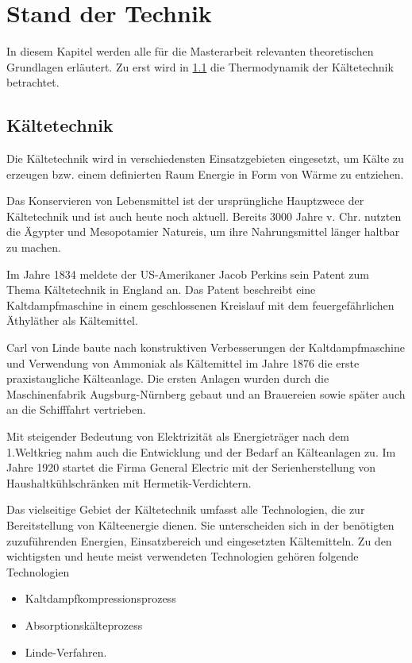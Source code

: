 \chapter{Stand der Technik}
\label{cha:Stand der Technik}

In diesem Kapitel werden alle für die Masterarbeit relevanten theoretischen Grundlagen erläutert. 
Zu erst wird in \ref{sec:Kaeltetechnik} die Thermodynamik der Kältetechnik betrachtet. 

\section{Kältetechnik}
\label{sec:Kaeltetechnik}

Die Kältetechnik wird in verschiedensten Einsatzgebieten eingesetzt, um Kälte zu erzeugen bzw. einem definierten Raum Energie in Form von Wärme zu entziehen. 

Das Konservieren von Lebensmittel ist  der ursprüngliche Hauptzwece der Kältetechnik und ist auch heute noch aktuell. Bereits 3000 Jahre v. Chr. nutzten die Ägypter und Mesopotamier Natureis, um ihre Nahrungsmittel länger haltbar zu machen.\citep{Danfoss2006}

Im Jahre 1834 meldete der US-Amerikaner Jacob Perkins sein Patent zum Thema Kältetechnik in England an. Das Patent beschreibt eine Kaltdampfmaschine in einem geschlossenen Kreislauf mit dem feuergefährlichen Äthyläther als Kältemittel.\citep{Siemens2007}

Carl von Linde baute nach konstruktiven Verbesserungen der Kaltdampfmaschine und Verwendung von Ammoniak als Kältemittel im Jahre 1876 die erste praxistaugliche Kälteanlage. Die ersten Anlagen wurden durch die Maschinenfabrik Augsburg-Nürnberg gebaut und an Brauereien sowie später auch an die Schifffahrt vertrieben.

Mit steigender Bedeutung von Elektrizität als Energieträger nach dem 1.Weltkrieg nahm auch die Entwicklung und der Bedarf an Kälteanlagen zu. Im Jahre 1920 startet die Firma General Electric mit der Serienherstellung von Haushaltkühlschränken mit Hermetik-Verdichtern.

Das vielseitige Gebiet der Kältetechnik umfasst alle Technologien, die zur Bereitstellung von Kälteenergie dienen. Sie unterscheiden sich in der benötigten zuzuführenden Energien, Einsatzbereich und eingesetzten Kältemitteln.  Zu den wichtigsten und heute meist verwendeten Technologien gehören folgende Technologien

\begin{itemize}

\item Kaltdampfkompressionsprozess
\item Absorptionskälteprozess
\item Linde-Verfahren.

\end{itemize}

